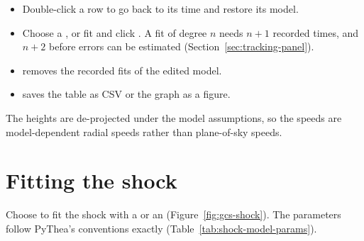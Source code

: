 
\begin{itemize}
  \item Double-click a row to go back to its time and restore its model.
  \item Choose a ,  or  fit and click
    . A fit of degree \(n\) needs \(n+1\) recorded times, and \(n+2\)
    before errors can be estimated (Section~\ref{sec:tracking-panel}).
  \item {} removes the recorded fits of the edited model.
  \item {} saves the table as CSV or the graph as a figure.
\end{itemize}
The heights are de-projected under the model assumptions, so the speeds are model-dependent
radial speeds rather than plane-of-sky speeds.

\section{Fitting the shock}
\label{sec:shock-fitting}

Choose  to fit the shock with a  or an 
(Figure~\ref{fig:gcs-shock}). The parameters follow PyThea's conventions exactly
(Table~\ref{tab:shock-model-params}).

